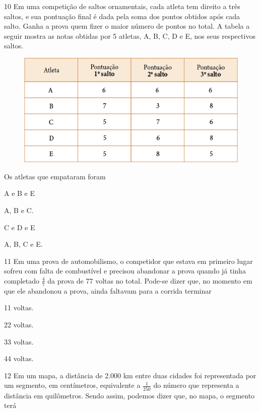 \num{10} Em uma competição de saltos ornamentais, cada atleta tem direito a três saltos,
e sua pontuação final é dada pela soma dos pontos obtidos após cada salto. Ganha a prova quem
fizer o maior número de pontos no total. A tabela a seguir mostra as notas obtidas por 5 atletas, A, B, C, D e E, nos seus respectivos saltos.

\begin{figure}[htpb!]
\centering
\includegraphics[width=\textwidth]{media/image88.png}
\end{figure}

Os atletas que empataram foram

\begin{multicols}{2}
\begin{escolha}
\item
  A e B e E
\item
  A, B e C.
\item
  C e D e E
\item
  A, B, C e E.
\end{escolha}
\end{multicols}

\num{11} Em uma prova de automobilismo, o competidor que estava em primeiro lugar
sofreu com falta de combustível e precisou abandonar a prova quando já
tinha completado $\frac{4}{7}$ da prova de 77 voltas no total. Pode-se dizer que,
no momento em que ele abandonou a prova, ainda faltavam para a corrida
terminar

\begin{escolha}
\item
  11 voltas.
\item
  22 voltas.
\item
  33 voltas.
\item
  44 voltas.
\end{escolha}


\num{12} Em um mapa, a distância de 2.000 km entre duas cidades foi representada
por um segmento, em centímetros, equivalente a $\frac{1}{250}$ do número que
representa a distância em quilômetros. Sendo assim, podemos dizer que, no
mapa, o segmento terá


